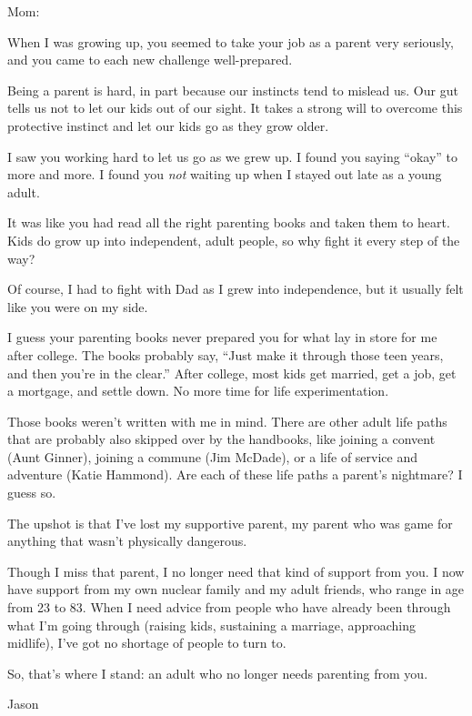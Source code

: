 \documentclass[12pt]{letter}
\begin{document}
\begin{letter}{}

\signature{Jason}


\opening{Mom:}

When I was growing up, you seemed to take your job as a parent very seriously, and you came to each new challenge well-prepared.

Being a parent is hard, in part because our instincts tend to mislead us.  Our gut tells us not to let our kids out of our sight.  It takes a strong will to overcome this protective instinct and let our kids go as they grow older.

I saw you working hard to let us go as we grew up.  I found you saying ``okay'' to more and more.  I found you {\it not} waiting up when I stayed out late as a young adult.

It was like you had read all the right parenting books and taken them to heart.  Kids do grow up into independent, adult people, so why fight it every step of the way?

Of course, I had to fight with Dad as I grew into independence, but it usually felt like you were on my side.

I guess your parenting books never prepared you for what lay in store for me after college.  The books probably say, ``Just make it through those teen years, and then you're in the clear.''  After college, most kids get married, get a job, get a mortgage, and settle down.  No more time for life experimentation.

Those books weren't written with me in mind.  There are other adult life paths that are probably also skipped over by the handbooks, like joining a convent (Aunt Ginner), joining a commune (Jim McDade), or a life of service and adventure (Katie Hammond).  Are each of these life paths a parent's nightmare?  I guess so.

The upshot is that I've lost my supportive parent, my parent who was game for anything that wasn't physically dangerous.  

Though I miss that parent, I no longer need that kind of support from you.  I now have support from my own nuclear family and my adult friends, who range in age from 23 to 83.  When I need advice from people who have already been through what I'm going through (raising kids, sustaining a marriage, approaching midlife), I've got no shortage of people to turn to.

So, that's where I stand:  an adult who no longer needs parenting from you.

\vspace{.25in}

\noindent Jason

\end{letter}
\end{document}
